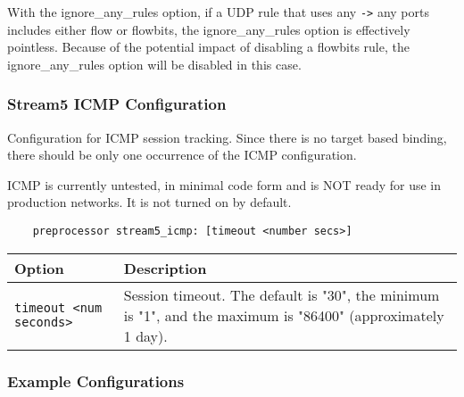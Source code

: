 \documentclass[english]{report}
\newenvironment{note}{
\samepage
    \vspace{10pt}{\textsf{
        {\hspace{7pt}\Huge{$\triangle$\hspace{-12.5pt}{\Large{$^!$}}}}\hspace{5pt}
        {\Large{NOTE}}
    }
    }
   \begin{center}
    \par\vspace{-17pt}

    \begin{lrbox}{\savepar}
    \begin{minipage}[r]{6in}
}
{
    \end{minipage}
    \end{lrbox}
    \fbox{
        \usebox{
            \savepar
	}
    }
    \par\vskip10pt
    \end{center}
}
\newenvironment{note}{
        \begin{rawhtml}
        <p><table border="1"><tr><td><b>
        Note:&nbsp;&nbsp;</b>
        \end{rawhtml}
}{
        \begin{rawhtml}
        </b></td></tr></table></p>
        \end{rawhtml}
}
\begin{document}
\begin{note}

With the ignore\_any\_rules option, if a UDP rule that uses any \texttt{->} any
ports includes either flow or flowbits, the ignore\_any\_rules option is
effectively pointless.  Because of the potential impact of disabling a flowbits
rule, the ignore\_any\_rules option will be disabled in this case.

\end{note}

\subsubsection{Stream5 ICMP Configuration}

Configuration for ICMP session tracking.  Since there is no target based
binding, there should be only one occurrence of the ICMP configuration.

\begin{note}

ICMP is currently untested, in minimal code form and is NOT ready for use in
production networks.  It is not turned on by default.

\end{note}

\begin{verbatim}
    preprocessor stream5_icmp: [timeout <number secs>]
\end{verbatim}

\begin{center}
\begin{tabular}{| l | p{4.5in} |}

\hline
\textbf{Option} & \textbf{Description}\\
\hline 

\hline 
\texttt{timeout <num seconds>} &

Session timeout.  The default is "30", the minimum is "1", and the maximum is
"86400" (approximately 1 day).\\

\hline
\end{tabular}
\end{center}

\subsubsection{Example Configurations}
\end{document}
